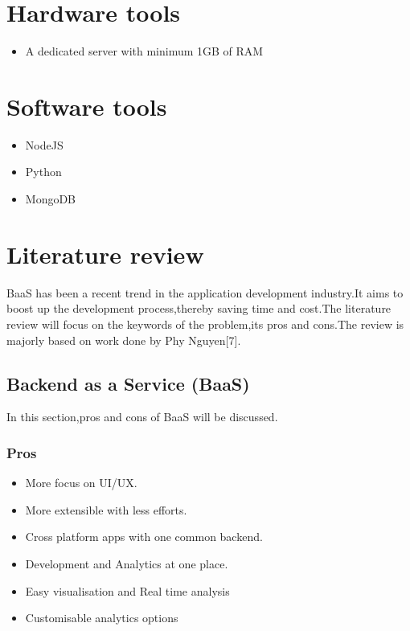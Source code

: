 \documentclass[a4paper,12pt]{report}
\begin{document}
    \section{Hardware tools}    
    \begin{itemize}
    \item A dedicated server with minimum 1GB of RAM
    \end{itemize}

    \section{Software tools}    
    \begin{itemize}
    \item NodeJS     
    \item Python
    \item MongoDB
    \end{itemize}
            
    \section{Literature review}
    BaaS has been a recent trend in the application development industry.It aims to boost up the development process,thereby saving time and cost.The literature review will focus on the keywords of the problem,its pros and cons.The review is majorly based on work done by Phy Nguyen[7].
    
    \subsection{Backend as a Service (BaaS)}
    In this section,pros and cons of BaaS will be discussed. 
    \subsubsection{Pros}
    \begin{itemize}
      \item More focus on UI/UX.
      \item More extensible with less efforts.
      \item Cross platform apps with one common backend.
      \item Development and Analytics at one place.
      \item Easy visualisation and Real time analysis      
      \item Customisable analytics options      
      \end{itemize}
\end{document}
